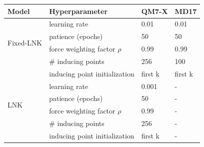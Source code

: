 \begin{tabular}{llll}
\hline
Model & Hyperparameter & QM7-X & MD17 \\
\hline
\multirow{4}{*}{Fixed-LNK}          
& learning rate                     &  0.01         &  0.01 \\
& patience (epochs)                 & 50            & 50\\
& force weighting factor $\rho$     & 0.99          & 0.99\\
& \# inducing points                & 256           & 100\\
& inducing point initialization     & first k       & first k\\\hline
\multirow{4}{*}{LNK}        
& learning rate                     & 0.001         & -\\
& patience (epochs)                 & 50            & -\\
& force weighting factor $\rho$     & 0.99          & -\\
& \# inducing points                & 256           & -\\
& inducing point initialization     & first k       & -\\\hline
\end{tabular}
